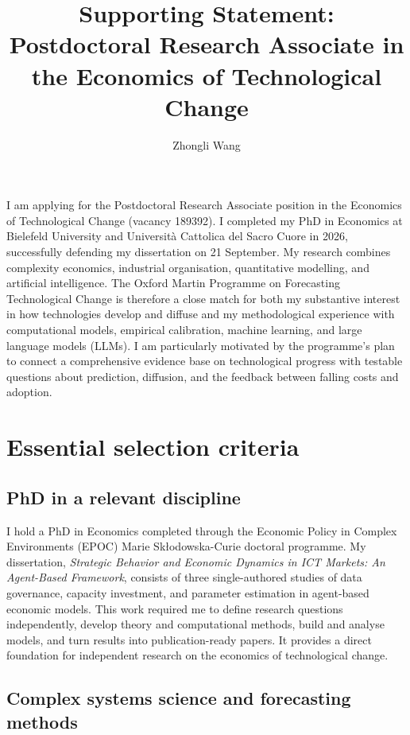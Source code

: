 \documentclass{nfr}
\title{Supporting Statement: Postdoctoral Research Associate in the Economics of Technological Change}
\author{Zhongli Wang}
\begin{document}
\maketitle

I am applying for the Postdoctoral Research Associate position in the Economics of Technological Change (vacancy 189392). I completed my PhD in Economics at Bielefeld University and Universit\`a Cattolica del Sacro Cuore in 2026, successfully defending my dissertation on 21 September. My research combines complexity economics, industrial organisation, quantitative modelling, and artificial intelligence. The Oxford Martin Programme on Forecasting Technological Change is therefore a close match for both my substantive interest in how technologies develop and diffuse and my methodological experience with computational models, empirical calibration, machine learning, and large language models (LLMs). I am particularly motivated by the programme's plan to connect a comprehensive evidence base on technological progress with testable questions about prediction, diffusion, and the feedback between falling costs and adoption.

\section*{Essential selection criteria}

\subsection*{PhD in a relevant discipline}

I hold a PhD in Economics completed through the Economic Policy in Complex Environments (EPOC) Marie Sk\l odowska-Curie doctoral programme. My dissertation, \textit{Strategic Behavior and Economic Dynamics in ICT Markets: An Agent-Based Framework}, consists of three single-authored studies of data governance, capacity investment, and parameter estimation in agent-based economic models. This work required me to define research questions independently, develop theory and computational methods, build and analyse models, and turn results into publication-ready papers. It provides a direct foundation for independent research on the economics of technological change.

\subsection*{Complex systems science and forecasting methods}
\end{document}
